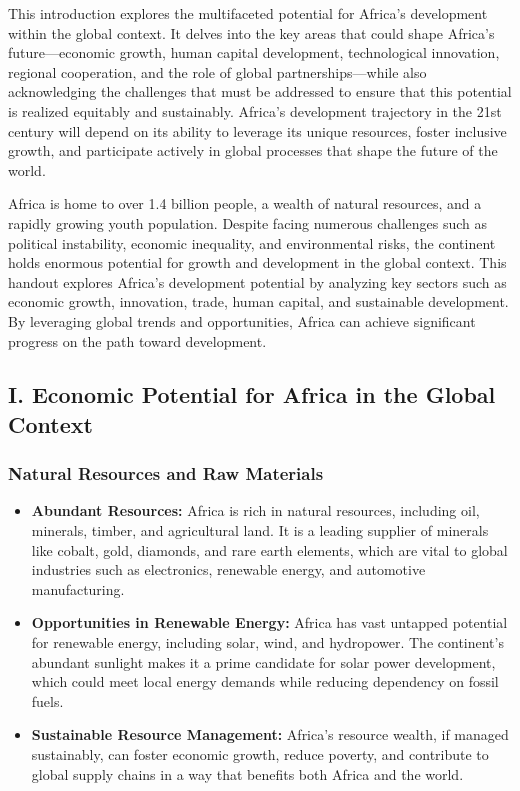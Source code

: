 \documentclass[10pt]{article}
\begin{document}
This introduction explores the multifaceted potential for Africa's development within the global
context. It delves into the key areas that could shape Africa's future---economic growth, human
capital development, technological innovation, regional cooperation, and the role of global
partnerships---while also acknowledging the challenges that must be addressed to ensure that
this potential is realized equitably and sustainably. Africa's development trajectory in the 21st
century will depend on its ability to leverage its unique resources, foster inclusive growth, and
participate actively in global processes that shape the future of the world.

Africa is home to over 1.4 billion people, a wealth of natural resources, and a rapidly growing
youth population. Despite facing numerous challenges such as political instability, economic
inequality, and environmental risks, the continent holds enormous potential for growth and
development in the global context. This handout explores Africa's development potential by
analyzing key sectors such as economic growth, innovation, trade, human capital, and
sustainable development. By leveraging global trends and opportunities, Africa can achieve
significant progress on the path toward development.

\subsection*{I. Economic Potential for Africa in the Global Context}

\subsubsection*{Natural Resources and Raw Materials}
\begin{itemize}
  \item \textbf{Abundant Resources:} Africa is rich in natural resources, including oil, minerals,
    timber, and agricultural land. It is a leading supplier of minerals like cobalt, gold,
    diamonds, and rare earth elements, which are vital to global industries such as
    electronics, renewable energy, and automotive manufacturing.

  \item \textbf{Opportunities in Renewable Energy:} Africa has vast untapped potential for
    renewable energy, including solar, wind, and hydropower. The continent's
    abundant sunlight makes it a prime candidate for solar power development,
    which could meet local energy demands while reducing dependency on fossil
    fuels.

  \item \textbf{Sustainable Resource Management:} Africa's resource wealth, if managed
    sustainably, can foster economic growth, reduce poverty, and contribute to
    global supply chains in a way that benefits both Africa and the world.
\end{itemize}
\end{document}
